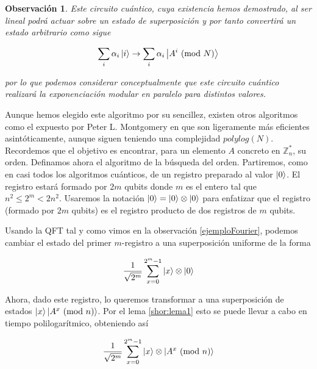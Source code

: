 \documentclass[11pt, spanish]{report}
\numberwithin{equation}{section}
\newtheorem{obs}[defin]{Observación}
\numberwithin{defin}{section}
\begin{document}
\begin{obs}
Este circuito cuántico, cuya existencia hemos demostrado, al ser lineal podrá actuar sobre un estado de superposición y por tanto convertirá un estado arbitrario como sigue

\begin{equation}
\sum_i \alpha_i\ket{i}\rightarrow\sum_i \alpha_i \ket{A^i\ (\text{mod }N)}
\end{equation}

\noindent por lo que podemos considerar conceptualmente que este circuito cuántico realizará la exponenciación modular en paralelo para distintos valores.
\end{obs}

Aunque hemos elegido este algoritmo por su sencillez, existen otros algoritmos como el expuesto por Peter L. Montgomery en \cite	{Montgomery} que son ligeramente más eficientes asintóticamente, aunque siguen teniendo una complejidad $polylog(N)$.\\

Recordemos que el objetivo es encontrar, para un elemento $A$ concreto en $\mathbb{Z}_n^*$, su orden. Definamos ahora el algoritmo de la búsqueda del orden. Partiremos, como en casi todos los algoritmos cuánticos, de un registro preparado al valor $\ket{0}$. El registro estará formado por $2m$ qubits donde $m$ es el entero tal que\footnotemark{} $n^2\leq 2^m < 2n^2$. Usaremos la notación $\ket{0}=\ket{0}\otimes\ket{0}$ para enfatizar que el registro (formado por $2m$ qubits) es el registro producto de dos registros de $m$ qubits.\\


Usando la QFT tal y como vimos en la observación \ref{ejemploFourier}, podemos cambiar el estado del primer $m$-registro a una superposición uniforme de la forma

\begin{equation}
\frac{1}{\sqrt{2^m}}\sum_{x=0}^{2^m-1} \ket{x}\otimes\ket{0}
\end{equation}

Ahora, dado este registro, lo queremos transformar a una superposición de estados $\ket{x}\ket{A^x\ (\text{mod }n)}$. Por el lema \ref{shor:lema1} esto se puede llevar a cabo en tiempo polilogarítmico, obteniendo así

\begin{equation}
\frac{1}{\sqrt{2^m}}\sum_{x=0}^{2^m-1} \ket{x}\otimes\ket{A^x\ (\text{mod }n)}
\end{equation}
\end{document}
